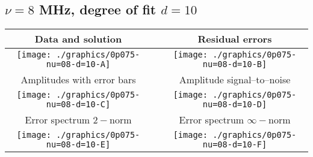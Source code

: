 

% 

\clearpage{}
\break{}

\subsection{$\nu = 8$ MHz, degree of fit $d = 10$}

\begin{table}[h]
    \begin{center}
        \begin{tabular}{ccc}
            Data and solution & \quad & Residual errors \\\hline
            \texttt{[image: ./graphics/0p075-nu=08-d=10-A]} &&
            \texttt{[image: ./graphics/0p075-nu=08-d=10-B]} \\[15pt]
            Amplitudes with error bars && Amplitude signal--to--noise \\\hline
            \texttt{[image: ./graphics/0p075-nu=08-d=10-C]} &&
            \texttt{[image: ./graphics/0p075-nu=08-d=10-D]} \\[15pt]
            Error spectrum $2-$norm && Error spectrum $\infty-$norm \\\hline
            \texttt{[image: ./graphics/0p075-nu=08-d=10-E]} &&
            \texttt{[image: ./graphics/0p075-nu=08-d=10-F]} \\[15pt]
        \end{tabular}
    \end{center}
\label{fig:elev=75, nu=8}
\end{table}



\endinput
